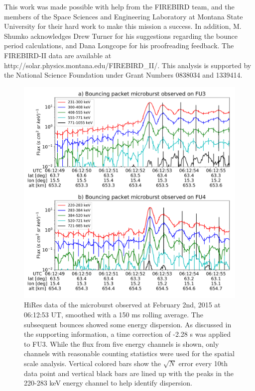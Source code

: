 \documentclass[draft, linenumbers]{agujournal}
\begin{document}
\acknowledgments
This work was made possible with help from the FIREBIRD team, and the members of the Space Sciences and Engineering Laboratory at Montana State University for their hard work to make this mission a success. In addition, M. Shumko acknowledges Drew Turner for his suggestions regarding the bounce period calculations, and Dana Longcope for his proofreading feedback. The FIREBIRD-II data are available at http://solar.physics.montana.edu/FIREBIRD\_II/. This analysis is supported by the National Science Foundation under Grant Numbers 0838034 and 1339414.

\begin{figure}
\includegraphics[width=\textwidth]{hires_plot_log_8pt_smooth_pos_v2.pdf}
\caption{HiRes data of the microburst observed at February 2nd, 2015 at 06:12:53 UT, smoothed with a 150 ms rolling average. The subsequent bounces showed some energy dispersion. As discussed in the supporting information, a time correction of -2.28 s was applied to FU3. While the flux from five energy channels is shown, only channels with reasonable counting statistics were used for the spatial scale analysis. Vertical colored bars show the $\sqrt{N}$ error every 10th data point and vertical black bars are lined up with the peaks in the 220-283 keV energy channel to help identify dispersion.}
\label{hires_plot}
\end{figure}
\end{document}
